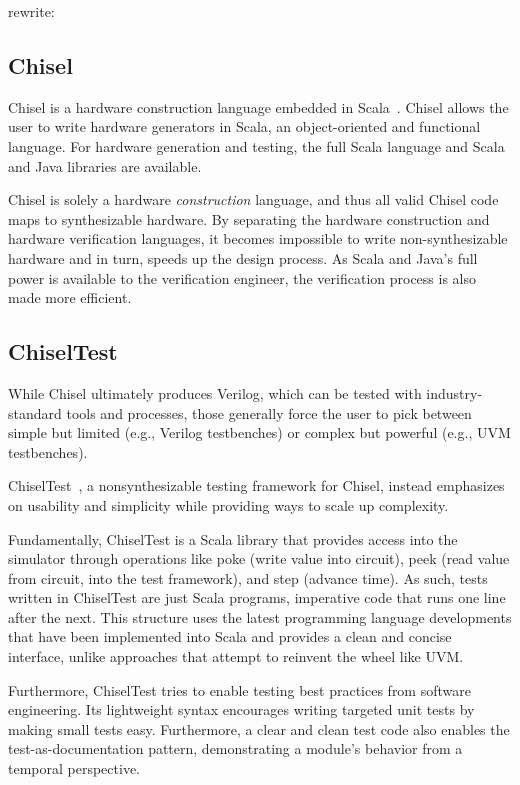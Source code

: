 \documentclass[conference]{IEEEtran}
\newcommand{\rewrite}[1]{{\color{red} rewrite: #1}}
\begin{document}
\rewrite{

\subsection{Chisel}

Chisel is a hardware construction language embedded in Scala~\cite{chisel:dac2012}.
Chisel allows the user to write hardware generators in Scala, an object-oriented and functional language. For hardware generation and testing, the full Scala language and Scala and Java
libraries are available.

Chisel is solely a hardware \emph{construction} language, and thus all valid Chisel code
maps to synthesizable hardware.
By separating the hardware construction and hardware verification languages,
it becomes impossible to write non-synthesizable hardware and in turn, speeds up the design process.
As Scala and Java's full power is available to the verification engineer,
the verification process is also made more efficient.

\subsection{ChiselTest}

While Chisel ultimately produces Verilog, which can be tested with industry-standard tools and processes, those generally force the user to pick between simple but limited (e.g., Verilog testbenches) or complex but powerful (e.g., UVM testbenches).

ChiselTest~\cite{chisel:tester2}, a nonsynthesizable testing framework for Chisel, instead emphasizes on usability and simplicity while providing ways to scale up complexity.

Fundamentally, ChiselTest is a Scala library that provides access into the simulator through operations like poke (write value into circuit), peek (read value from circuit, into the test framework), and step (advance time).
As such, tests written in ChiselTest are just Scala programs, imperative code that runs one line after the next.
This structure uses the latest programming language developments that have been implemented into Scala and provides a clean and concise interface, unlike approaches that attempt to reinvent the wheel like UVM.

Furthermore, ChiselTest tries to enable testing best practices from software engineering.
Its lightweight syntax encourages writing targeted unit tests by making small tests easy.
Furthermore, a clear and clean test code also enables the test-as-documentation pattern,
demonstrating a module's behavior from a temporal perspective.}
\end{document}
